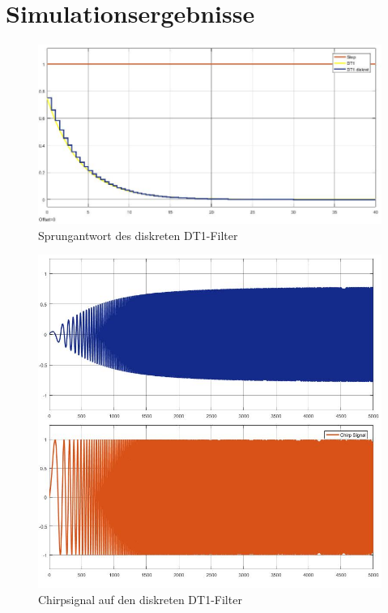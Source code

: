 \documentclass[12pt,a4paper]{report}
\begin{document}
\section{Simulationsergebnisse}
\begin{figure}[ht]
	\centering
	\includegraphics[width=0.9\linewidth]{marius/DT1_Step}
	\caption{Sprungantwort des diskreten DT1-Filter}
	\label{fig:DT1_Step}
\end{figure}
\begin{figure}[ht]
	\centering
	\includegraphics[width=0.9\linewidth]{marius/DT1_Chrip_0,001-0,2Hz}
	\caption{Chirpsignal auf den diskreten DT1-Filter}
	\label{fig:DT1_Chirp}
\end{figure}
\end{document}
